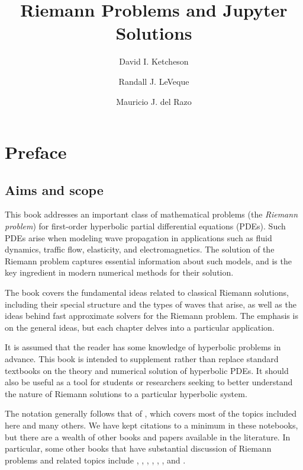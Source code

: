 \documentclass{SIAMbook2016}
\title{Riemann Problems and Jupyter Solutions}
\author{David I. Ketcheson \and Randall J. LeVeque \and Mauricio J. del Razo}
\begin{document}
    
    
    
    
\maketitle

    
    
    \tableofcontents


    
\hypertarget{preface}{%
\chapter*{Preface}\label{preface}}
\label{sec:00-Preface}
\hypertarget{aims-and-scope}{%
\section*{Aims and scope}\label{aims-and-scope}}

This book addresses an important class of mathematical problems (the
\emph{Riemann problem}) for first-order hyperbolic partial differential
equations (PDEs). Such PDEs arise when modeling wave propagation in
applications such as fluid dynamics, traffic flow, elasticity, and
electromagnetics. The solution of the Riemann problem captures essential
information about such models, and is the key ingredient in modern
numerical methods for their solution.

The book covers the fundamental ideas related to classical Riemann
solutions, including their special structure and the types of waves that
arise, as well as the ideas behind fast approximate solvers for the
Riemann problem. The emphasis is on the general ideas, but each chapter
delves into a particular application.

It is assumed that the reader has some knowledge of hyperbolic problems
in advance. This book is intended to supplement rather than replace
standard textbooks on the theory and numerical solution of hyperbolic
PDEs. It should also be useful as a tool for students or researchers
seeking to better understand the nature of Riemann solutions to a
particular hyperbolic system.

The notation generally follows that of \cite{fvmhp}, which covers most
of the topics included here and many others. We have kept citations to a
minimum in these notebooks, but there are a wealth of other books and
papers available in the literature. In particular, some other books that
have substantial discussion of Riemann problems and related topics
include \cite{lax:cbms}, \cite{rjl:eth}, \cite{god-rav},
\cite{kroener1997}, \cite{trangenstein2009}, \cite{toro2013riemann}, and
\cite{hesthaven2018}.
\end{document}
